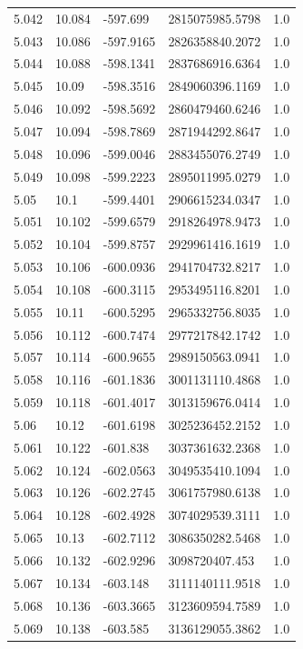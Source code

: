 \begin{tabular}{lllll}
5.042 & 10.084 & -597.699 & 2815075985.5798 & 1.0 \\
5.043 & 10.086 & -597.9165 & 2826358840.2072 & 1.0 \\
5.044 & 10.088 & -598.1341 & 2837686916.6364 & 1.0 \\
5.045 & 10.09 & -598.3516 & 2849060396.1169 & 1.0 \\
5.046 & 10.092 & -598.5692 & 2860479460.6246 & 1.0 \\
5.047 & 10.094 & -598.7869 & 2871944292.8647 & 1.0 \\
5.048 & 10.096 & -599.0046 & 2883455076.2749 & 1.0 \\
5.049 & 10.098 & -599.2223 & 2895011995.0279 & 1.0 \\
5.05 & 10.1 & -599.4401 & 2906615234.0347 & 1.0 \\
5.051 & 10.102 & -599.6579 & 2918264978.9473 & 1.0 \\
5.052 & 10.104 & -599.8757 & 2929961416.1619 & 1.0 \\
5.053 & 10.106 & -600.0936 & 2941704732.8217 & 1.0 \\
5.054 & 10.108 & -600.3115 & 2953495116.8201 & 1.0 \\
5.055 & 10.11 & -600.5295 & 2965332756.8035 & 1.0 \\
5.056 & 10.112 & -600.7474 & 2977217842.1742 & 1.0 \\
5.057 & 10.114 & -600.9655 & 2989150563.0941 & 1.0 \\
5.058 & 10.116 & -601.1836 & 3001131110.4868 & 1.0 \\
5.059 & 10.118 & -601.4017 & 3013159676.0414 & 1.0 \\
5.06 & 10.12 & -601.6198 & 3025236452.2152 & 1.0 \\
5.061 & 10.122 & -601.838 & 3037361632.2368 & 1.0 \\
5.062 & 10.124 & -602.0563 & 3049535410.1094 & 1.0 \\
5.063 & 10.126 & -602.2745 & 3061757980.6138 & 1.0 \\
5.064 & 10.128 & -602.4928 & 3074029539.3111 & 1.0 \\
5.065 & 10.13 & -602.7112 & 3086350282.5468 & 1.0 \\
5.066 & 10.132 & -602.9296 & 3098720407.453 & 1.0 \\
5.067 & 10.134 & -603.148 & 3111140111.9518 & 1.0 \\
5.068 & 10.136 & -603.3665 & 3123609594.7589 & 1.0 \\
5.069 & 10.138 & -603.585 & 3136129055.3862 & 1.0 \\

\end{tabular}
